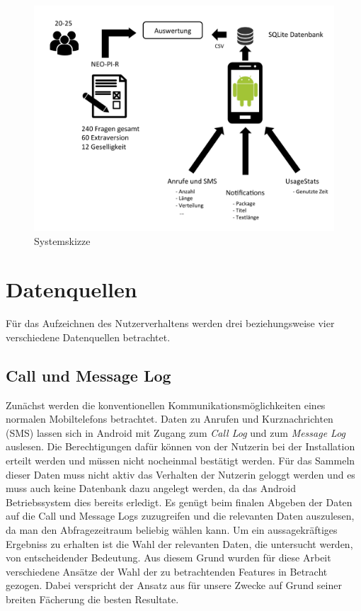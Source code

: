\par

\begin{figure}[h]
    \centering
    \includegraphics[width=\textwidth]{images/skizze.pdf}
    \caption{Systemskizze}
    \label{skizze}
\end{figure}


\section{Datenquellen}

Für das Aufzeichnen des Nutzerverhaltens werden drei beziehungsweise vier verschiedene Datenquellen betrachtet.
\par

\subsection{Call und Message Log}
Zunächst werden die konventionellen Kommunikationsmöglichkeiten eines normalen Mobiltelefons betrachtet.
Daten zu Anrufen und Kurznachrichten (SMS) lassen sich in Android mit Zugang zum \emph{Call Log} und zum \emph{Message Log} auslesen.
Die Berechtigungen dafür können von der Nutzerin bei der Installation erteilt werden und müssen nicht nocheinmal bestätigt werden.
Für das Sammeln dieser Daten muss nicht aktiv das Verhalten der Nutzerin geloggt werden und es muss auch keine Datenbank dazu angelegt werden,
da das Android Betriebssystem dies bereits erledigt.
Es genügt beim finalen Abgeben der Daten auf die Call und Message Logs zuzugreifen und die relevanten Daten auszulesen, da man den Abfragezeitraum beliebig wählen kann.
Um ein aussagekräftiges Ergebniss zu erhalten ist die Wahl der relevanten Daten, die untersucht werden, von entscheidender Bedeutung. 
Aus diesem Grund wurden für diese Arbeit verschiedene Ansätze der Wahl der zu betrachtenden Features in Betracht gezogen. 
Dabei verspricht der Ansatz aus \cite{chittaranjan2011s} für unsere Zwecke auf Grund seiner breiten Fächerung die besten Resultate.
\par


